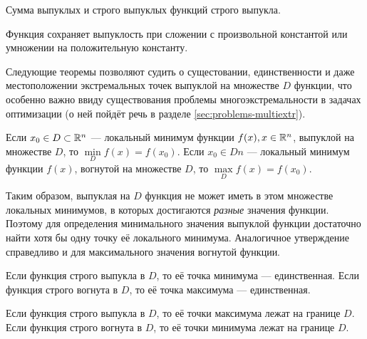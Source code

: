 \begin{thm}
  \label{th:sconvex-f-sum}
  Сумма выпуклых и строго выпуклых функций строго выпукла.
\end{thm}

\begin{thm}
  \label{th:convex-f-factor}
  Функция сохраняет выпуклость при сложении с произвольной константой
  или умножении на положительную константу.
\end{thm}

Следующие теоремы позволяют судить о сущестовании, единственности и
даже местоположении экстремальных точек выпуклой на множестве $D$
функции, что особенно важно ввиду существования проблемы
многоэкстремальности в задачах оптимизации (о ней пойдёт речь в
разделе \ref{sec:problems-multiextr}).

\begin{thm}
  \label{th:convex-f-locmin}
  Если $x_0 \in D \subset \mathbb{R}^n$ — локальный минимум функции
  $f(x), x \in \mathbb{R}^n$, выпуклой на множестве $D$, то
  $\underset{D}{\min}{f(x)} = f(x_0)$.
  Если $x_0 \in Dn$ — локальный минимум функции $f(x)$, вогнутой на
  множестве $D$, то $\underset{D}{\max}{f(x)} = f(x_0)$.
\end{thm}
Таким образом, выпуклая на $D$ функция не может иметь в этом множестве
локальных минимумов, в которых достигаются \emph{разные} значения
функции. Поэтому для определения минимального значения выпуклой
функции достаточно найти хотя бы одну точку её локального минимума.
Аналогичное утверждение справедливо и для максимального значения
вогнутой функции.

\begin{thm}
  \label{th:convex-f-smin}
  Если функция строго выпукла в $D$, то её точка минимума —
  единственная.
  Если функция строго вогнута в $D$, то её точка максимума —
  единственная.
\end{thm}

\begin{thm}
  \label{th:convex-f-nomax}
  Если функция строго выпукла в $D$, то её точки максимума лежат на
  границе $D$.
  Если функция строго вогнута в $D$, то её точки минимума лежат на
  границе $D$.
\end{thm}
